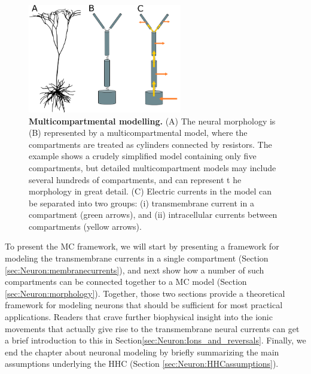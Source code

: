 \begin{figure}[!ht]
\begin{center}
\includegraphics[width=0.6\textwidth]{Figures/Neuron/multicompartment.png}
\end{center}
\caption{\textbf{Multicompartmental modelling.}  (A) The neural morphology is (B) represented by a multicompartmental model, where the compartments are treated as cylinders connected by resistors. The example shows a crudely simplified model containing only five compartments, but detailed multicompartment models may include several hundreds of compartments, and can represent t he morphology in great detail. (C) Electric currents in the model can be separated into two groups: (i) transmembrane current in a compartment (green arrows), and (ii) intracellular currents between compartments (yellow arrows). 
}
\label{Neuron:fig:multicomp}
\end{figure}

To present the MC framework, we will start by presenting a framework for modeling the transmembrane currents in a single compartment (Section \ref{sec:Neuron:membranecurrents}), and next show how a number of such compartments can be connected together to a MC model (Section \ref{sec:Neuron:morphology}). Together, those two sections provide a theoretical framework for modeling neurons that should be sufficient for most practical applications. Readers that crave further biophysical insight into the ionic movements that actually give rise to the transmembrane neural currents can get a brief introduction to this in Section\ref{sec:Neuron:Ions_and_reversals}. Finally, we end the chapter about neuronal modeling by briefly summarizing the main assumptions underlying the HHC (Section \ref{sec:Neuron:HHCassumptions}).


